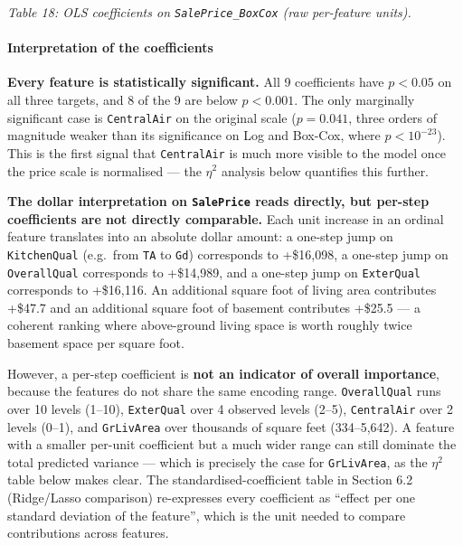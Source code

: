 \emph{Table 18: OLS coefficients on \texttt{SalePrice\_BoxCox} (raw
per-feature units).}

\paragraph{Interpretation of the
coefficients}\label{interpretation-of-the-coefficients}

\textbf{Every feature is statistically significant.} All 9 coefficients
have \(p < 0.05\) on all three targets, and 8 of the 9 are below
\(p < 0.001\). The only marginally significant case is
\texttt{CentralAir} on the original scale (\(p = 0.041\), three orders
of magnitude weaker than its significance on Log and Box-Cox, where
\(p < 10^{-23}\)). This is the first signal that \texttt{CentralAir} is
much more visible to the model once the price scale is normalised ---
the \(\eta^2\) analysis below quantifies this further.

\textbf{The dollar interpretation on \texttt{SalePrice} reads directly,
but per-step coefficients are not directly comparable.} Each unit
increase in an ordinal feature translates into an absolute dollar
amount: a one-step jump on \texttt{KitchenQual} (e.g.~from \texttt{TA}
to \texttt{Gd}) corresponds to +\$16,098, a one-step jump on
\texttt{OverallQual} corresponds to +\$14,989, and a one-step jump on
\texttt{ExterQual} corresponds to +\$16,116. An additional square foot
of living area contributes +\$47.7 and an additional square foot of
basement contributes +\$25.5 --- a coherent ranking where above-ground
living space is worth roughly twice basement space per square foot.

However, a per-step coefficient is \textbf{not an indicator of overall
importance}, because the features do not share the same encoding range.
\texttt{OverallQual} runs over 10 levels (1--10), \texttt{ExterQual}
over 4 observed levels (2--5), \texttt{CentralAir} over 2 levels (0--1),
and \texttt{GrLivArea} over thousands of square feet (334--5,642). A
feature with a smaller per-unit coefficient but a much wider range can
still dominate the total predicted variance --- which is precisely the
case for \texttt{GrLivArea}, as the \(\eta^2\) table below makes clear.
The standardised-coefficient table in Section 6.2 (Ridge/Lasso
comparison) re-expresses every coefficient as ``effect per one standard
deviation of the feature'', which is the unit needed to compare
contributions across features.

